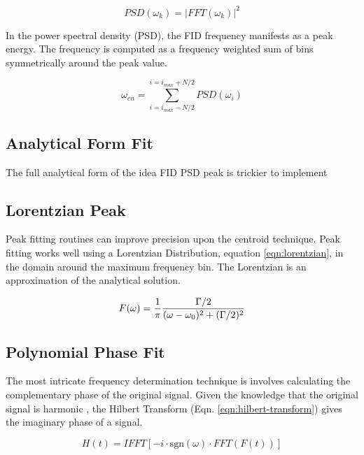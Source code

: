 \begin{equation}
\label{eqn:fid-psd}
PSD(\omega_k) = |FFT(\omega_k)|^2
\end{equation}

In the power spectral density (PSD), the FID frequency manifests as a peak energy.  The frequency is computed as a frequency weighted sum of bins symmetrically around the peak value.

\begin{equation}
\label{eqn:freq-cn}
\omega_{cn} = \sum_{i=i_{max} - N/2}^{i=i_{max} + N/2} PSD(\omega_i)
\end{equation}


\subsection{Analytical Form Fit}
The full analytical form of the idea FID PSD peak is trickier to implement


\subsection{Lorentzian Peak}
Peak fitting routines can improve precision upon the centroid technique.  Peak fitting works well using a Lorentzian Distribution, equation \ref{eqn:lorentzian}, in the domain around the maximum frequency bin.  The Lorentzian is an approximation of the analytical solution.

\begin{equation}
\label{eqn:lorentzian}
F(\omega) = \frac{1}{\pi} \\
\frac{\Gamma / 2}{(\omega - \omega_0)^2 + (\Gamma / 2)^2}
\end{equation}

\subsection{Polynomial Phase Fit}
The most intricate frequency determination technique is involves calculating the complementary phase of the original signal.  Given the knowledge that the original signal is harmonic , the Hilbert Transform (Eqn. \ref{eqn:hilbert-transform}) gives the imaginary phase of a signal.

\begin{equation}
\label{eqn:hilbert-transform}
H(t) = IFFT[-i \cdot \mathrm{sgn}(\omega) \cdot FFT(F(t))]
\end{equation}

